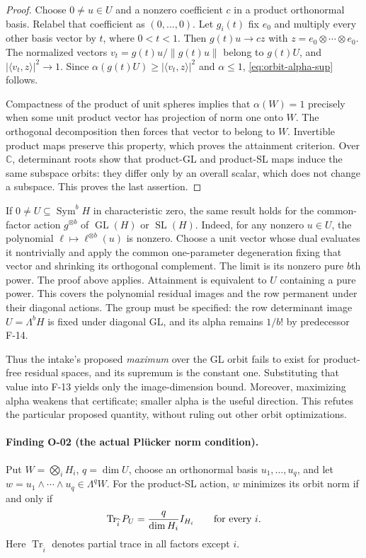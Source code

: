 \begin{proof}
Choose $0\ne u\in U$ and a nonzero coefficient $c$ in a product
orthonormal basis. Relabel that coefficient as $(0,\ldots,0)$.
Let $g_i(t)$ fix $e_0$ and multiply every other basis vector by
$t$, where $0<t<1$. Then
$g(t)u\longrightarrow c z$ with $z=e_0\otimes\cdots\otimes e_0$.
The normalized vectors $v_t=g(t)u/\|g(t)u\|$ belong to $g(t)U$,
and $|\langle v_t,z\rangle|^2\longrightarrow1$.
Since $\alpha(g(t)U)\geq|\langle v_t,z\rangle|^2$ and
$\alpha\leq1$, \eqref{eq:orbit-alpha-sup} follows.

Compactness of the product of unit spheres implies that
$\alpha(W)=1$ precisely when some unit product vector has
projection of norm one onto $W$. The orthogonal decomposition
then forces that vector to belong to $W$. Invertible product
maps preserve this property, which proves the attainment
criterion. Over $\mathbb C$, determinant roots show that
product-GL and product-SL maps induce the same subspace orbits:
they differ only by an overall scalar, which does not change
a subspace. This proves the last assertion.
\end{proof}

If $0\ne U\subseteq\operatorname{Sym}^b H$ in characteristic
zero, the same result holds for the common-factor action
$g^{\otimes b}$ of $\operatorname{GL}(H)$ or $\operatorname{SL}(H)$.
Indeed, for any nonzero $u\in U$, the polynomial
$\ell\mapsto\ell^{\otimes b}(u)$ is nonzero. Choose a unit vector
whose dual evaluates it nontrivially and apply the common
one-parameter degeneration fixing that vector and shrinking
its orthogonal complement. The limit is its nonzero pure
$b$th power. The proof above applies. Attainment is equivalent
to $U$ containing a pure power. This covers the polynomial
residual images and the row permanent under their diagonal
actions. The group must be specified: the row determinant
image $U=\Lambda^b H$ is fixed under diagonal GL, and its
alpha remains $1/b!$ by predecessor F-14.

Thus the intake's proposed \emph{maximum} over the GL orbit
fails to exist for product-free residual spaces, and its
supremum is the constant one. Substituting that value into
F-13 yields only the image-dimension bound. Moreover,
maximizing alpha weakens that certificate; smaller alpha is
the useful direction. This refutes the particular proposed
quantity, without ruling out other orbit optimizations.

\paragraph{Finding O-02 (the actual Pl\"ucker norm condition).}
Put $W=\bigotimes_iH_i$, $q=\dim U$, choose an orthonormal basis
$u_1,\ldots,u_q$, and let
$w=u_1\wedge\cdots\wedge u_q\in\Lambda^q W$. For the product-SL
action, $w$ minimizes its orbit norm if and only if
\begin{equation}\label{eq:plucker-moment}
 \operatorname{Tr}_{\widehat i}P_U={q\over\dim H_i}I_{H_i}
 \qquad\hbox{for every }i.
\end{equation}
Here $\operatorname{Tr}_{\widehat i}$ denotes partial trace
in all factors except $i$.

